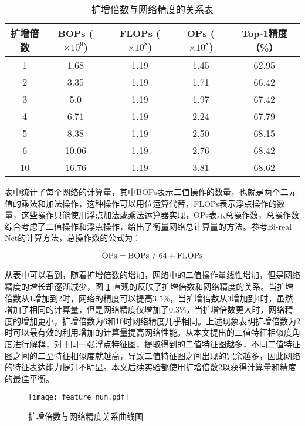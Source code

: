 \begin{table}[htb]
  \vspace{6pt}
  \centering
  \caption{扩增倍数与网络精度的关系表}
  \label{tab:3}
  \begin{tabular}{ccccc}
    \toprule
    扩增倍数 & BOPs ($\times10^9$) & FLOPs ($\times10^8$) & OPs ($\times10^8$) & Top-1精度（\%）\\
    \midrule
    1  & 1.68  & 1.19 & 1.45 & 62.95 \\
    2  & 3.35  & 1.19 & 1.71 & 66.42 \\
    3  & 5.0   & 1.19 & 1.97 & 67.42 \\
    4  & 6.71  & 1.19 & 2.24 & 67.79 \\
    5  & 8.38  & 1.19 & 2.50 & 68.15 \\
    6  & 10.06 & 1.19 & 2.76 & 68.42 \\
    10 & 16.76 & 1.19 & 3.81 & 68.62  \\
    \bottomrule
  \end{tabular}
  \vspace{6pt}
\end{table}

表中统计了每个网络的计算量，其中BOPs表示二值操作的数量，也就是两个二元值的乘法和加法操作，这种操作可以用位运算代替，FLOPs表示浮点操作的数量，这些操作只能使用浮点加法或乘法运算器实现，OPs表示总操作数，总操作数综合考虑了二值操作和浮点操作，给出了衡量网络总计算量的方法。参考Bi-real Net\cite{birealnet}的计算方法，总操作数的公式为：

\begin{equation}
  \label{eq:ops}
  \rm{OPs} = BOPs \ / \ 64 + FLOPs
\end{equation}

从表中可以看到，随着扩增倍数的增加，网络中的二值操作量线性增加，但是网络精度的增长却逐渐减少，图 \ref{fig:feature_num} 直观的反映了扩增倍数和网络精度的关系。当扩增倍数从1增加到2时，网络的精度可以提高3.5\%，当扩增倍数从3增加到4时，虽然增加了相同的计算量，但是网络精度仅增加了0.3\%，当扩增倍数更大时，网络精度的增加更小，扩增倍数为6和10时网络精度几乎相同。上述现象表明扩增倍数为2时可以最有效的利用增加的计算量提高网络性能。从本文提出的二值特征相似度角度进行解释，对于同一张浮点特征图，提取得到的二值特征图越多，不同二值特征图之间的二至特征相似度就越高，导致二值特征图之间出现的冗余越多，因此网络的特征表达能力提升不明显。本文后续实验都使用扩增倍数2以获得计算量和精度的最佳平衡。

\begin{figure}[htb]
  \centering
  \texttt{[image: feature\_num.pdf]}
  \caption{扩增倍数与网络精度关系曲线图}
  \label{fig:feature_num}
\end{figure}

